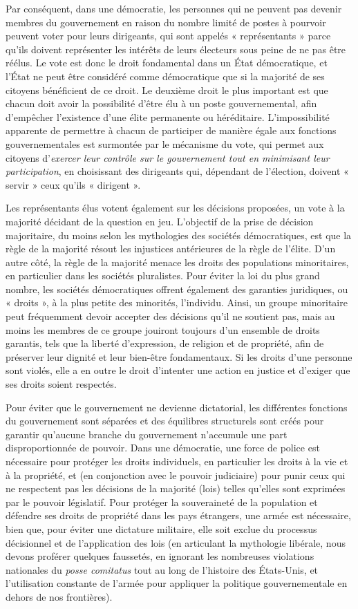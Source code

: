 Par conséquent, dans une démocratie, les personnes qui ne peuvent pas devenir membres du gouvernement en raison du nombre limité de postes à pourvoir peuvent voter pour leurs dirigeants, qui sont appelés « représentants » parce qu'ils doivent représenter les intérêts de leurs électeurs sous peine de ne pas être réélus. Le vote est donc le droit fondamental dans un État démocratique, et l'État ne peut être considéré comme démocratique que si la majorité de ses citoyens bénéficient de ce droit. Le deuxième droit le plus important est que chacun doit avoir la possibilité d'être élu à un poste gouvernemental, afin d'empêcher l'existence d'une élite permanente ou héréditaire. L'impossibilité apparente de permettre à chacun de participer de manière égale aux fonctions gouvernementales est surmontée par le mécanisme du vote, qui permet aux citoyens d'\emph{exercer leur contrôle sur le gouvernement tout en minimisant leur participation}, en choisissant des dirigeants qui, dépendant de l'élection, doivent « servir » ceux qu'ils « dirigent ».

Les représentants élus votent également sur les décisions proposées, un vote à la majorité décidant de la question en jeu. L'objectif de la prise de décision majoritaire, du moins selon les mythologies des sociétés démocratiques, est que la règle de la majorité résout les injustices antérieures de la règle de l'élite. D'un autre côté, la règle de la majorité menace les droits des populations minoritaires, en particulier dans les sociétés pluralistes. Pour éviter la loi du plus grand nombre, les sociétés démocratiques offrent également des garanties juridiques, ou « droits », à la plus petite des minorités, l'individu. Ainsi, un groupe minoritaire peut fréquemment devoir accepter des décisions qu'il ne soutient pas, mais au moins les membres de ce groupe jouiront toujours d'un ensemble de droits garantis, tels que la liberté d'expression, de religion et de propriété, afin de préserver leur dignité et leur bien-être fondamentaux. Si les droits d'une personne sont violés, elle a en outre le droit d'intenter une action en justice et d'exiger que ses droits soient respectés.

Pour éviter que le gouvernement ne devienne dictatorial, les différentes fonctions du gouvernement sont séparées et des équilibres structurels sont créés pour garantir qu'aucune branche du gouvernement n'accumule une part disproportionnée de pouvoir. Dans une démocratie, une force de police est nécessaire pour protéger les droits individuels, en particulier les droits à la vie et à la propriété, et (en conjonction avec le pouvoir judiciaire) pour punir ceux qui ne respectent pas les décisions de la majorité (lois) telles qu'elles sont exprimées par le pouvoir législatif. Pour protéger la souveraineté de la population et défendre ses droits de propriété dans les pays étrangers, une armée est nécessaire, bien que, pour éviter une dictature militaire, elle soit exclue du processus décisionnel et de l'application des lois (en articulant la mythologie libérale, nous devons proférer quelques faussetés, en ignorant les nombreuses violations nationales du \emph{posse comitatus} tout au long de l'histoire des États-Unis, et l'utilisation constante de l'armée pour appliquer la politique gouvernementale en dehors de nos frontières).

